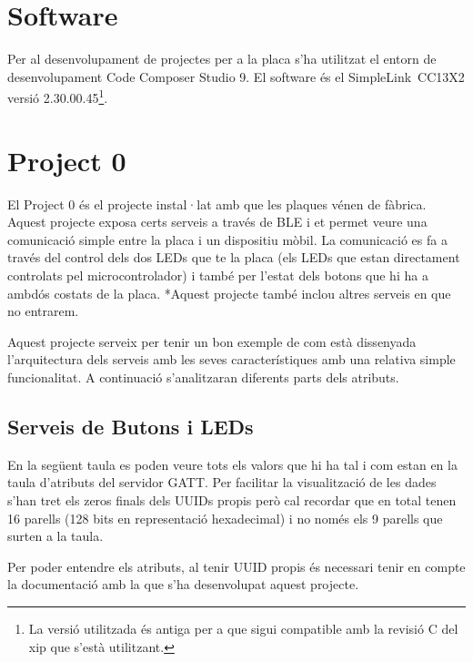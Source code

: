 \section{Software}
Per al desenvolupament de projectes per a la placa s'ha utilitzat el entorn de desenvolupament Code Composer Studio 9. El software és el SimpleLink\texttrademark\ CC13X2 versió 2.30.00.45\footnote{La versió utilitzada és antiga per a que sigui compatible amb la revisió C del xip que s'està utilitzant.}.

\section{Project 0}
El Project 0 és el projecte instal·lat amb que les plaques vénen de fàbrica. Aquest projecte exposa certs serveis a través de BLE i et permet veure una comunicació simple entre la placa i un dispositiu mòbil.
La comunicació es fa a través del control dels dos LEDs que te la placa (els LEDs que estan directament controlats pel microcontrolador) i també per l'estat dels botons que hi ha a ambdós costats de la placa.
*Aquest projecte també inclou altres serveis en que no entrarem.

Aquest projecte serveix per tenir un bon exemple de com està dissenyada l'arquitectura dels serveis amb les seves característiques amb una relativa simple funcionalitat. A continuació s'analitzaran diferents parts dels atributs.

\subsection{Serveis de Butons i LEDs}

En la següent taula es poden veure tots els valors que hi ha tal i com estan en la taula d'atributs del servidor GATT.
Per facilitar la visualització de les dades s'han tret els zeros finals dels UUIDs propis però cal recordar que en total tenen 16 parells (128 bits en representació hexadecimal) i no només els 9 parells que surten a la taula.

\begin{center}
	\begin{table}[h!]
	\end{table}
\end{center}

Per poder entendre els atributs, al tenir UUID propis és necessari tenir en compte la documentació amb la que s'ha desenvolupat aquest projecte.

